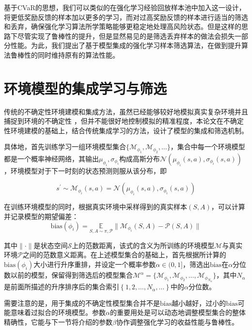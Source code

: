 基于CVaR的思想，我们可以类似的在强化学习经验回放样本池中加入这一设计，将更低奖励反馈的样本加以更多的学习，而对过高奖励反馈的样本进行适当的筛选和丢弃，确保强化学习算法所学策略能够更稳定地处理高风险状态。但是这样的思路下尽管实现了鲁棒性的提升，但是显然易见的是筛选丢弃样本的做法会损失一部分性能。为此，我们提出了基于模型集成的强化学习样本筛选算法，在做到提升算法鲁棒性的同时维持原有的算法性能。

\section{环境模型的集成学习与筛选}\label{sec:model-method}

传统的不确定性环境建模和集成方法，虽然已经能够较好地模拟真实复杂环境并且捕捉到环境的不确定性 \cite{duan2007multi}，但并不能很好地控制模拟的精准程度，本论文在不确定性环境建模的基础上，结合传统集成学习的方法，设计了模型的集成和筛选机制。

具体地，首先训练学习一组环境模型集合$\{\mathcal{M}_{\phi_1},\mathcal{M}_{\phi_2},\ldots\}$，集合中每一个环境模型都是一个概率神经网络，其输出$\mu_{\phi_i},\sigma_{\phi_i}$构成高斯分布$\mathcal{N}(\mu_{\phi_i}(s,a),\sigma_{\phi_i}(s,a))$，环境模型对于下一时刻的状态预测则服从该分布，即

\begin{equation}
    s^\prime \sim \mathcal{M}_{\phi_i}(s,a) = \mathcal{N}(\mu_{\phi_i}(s,a),\sigma_{\phi_i}(s,a))
\end{equation}

在训练环境模型的同时，根据真实环境中采样得到的真实样本$(S,A)$，可以计算并记录模型的期望偏差：
\begin{equation}
    \mathrm{bias}(\phi_i) = \underset{S,A\sim \pi,\mathcal{P}}{\mathbb{E}}\|\mathcal{M}_{\phi_i}(S,A)-\mathcal{P}(S,A)\|
\end{equation}

其中$\|\cdot\|$是状态空间$\mathcal{S}$上的范数距离，该式的含义为所训练的环境模型$\mathcal{M}$与真实环境$\mathcal{P}$之间的范数意义距离。在上述模型集合的基础上，首先根据所计算的$\mathrm{bias}(\phi_i)$大小进行升序重排，并设定一个概率参数$\alpha\in(0,1]$，筛选出$\mathrm{bias}$在$\alpha$分位数以前的模型，保留得到筛选后的模型集合$\mathcal{M}^\alpha = \{\mathcal{M}_{\phi_1},\mathcal{M}_{\phi_2},\ldots,\mathcal{M}_{\phi_{N_\alpha}}\}$，其中$N_\alpha$是前面所描述的升序排序后的集合索引$\left\{1,2,\ldots,N_\alpha,\ldots\right\}$中的$\alpha$分位数。

需要注意的是，用于集成的不确定性模型集合并不是$\mathrm{bias}$越小越好，过小的$\mathrm{bias}$可能意味着过拟合的环境模型。参数$\alpha$的重要用处是可以动态地调整模型集合的整体精确性，它能与下一节将介绍的参数$\beta$协作调整强化学习的收益性能与鲁棒性。

